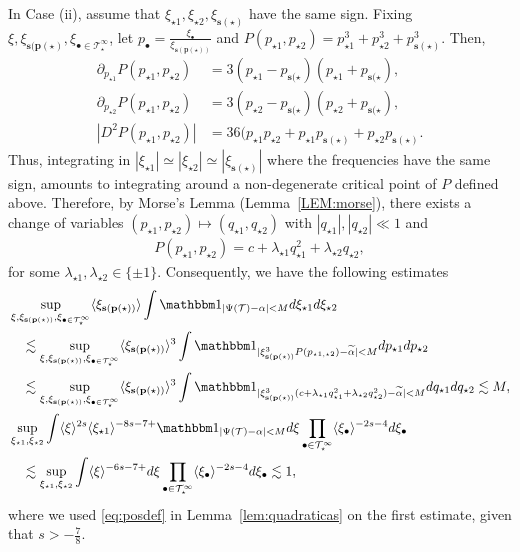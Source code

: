 \documentclass[%
11pt,  reqno]{amsart}
\newcommand{\5}{\textup{V}}
\newcommand{\ind}{\mathbbm 1}
\newcommand{\les}{\lesssim}
\newcommand{\wt}{\widetilde}
\theoremstyle{remark}
\newcommand{\bul}{\bullet}
\newcommand{\TT}{\mathcal{T}}
\newcommand{\al}{\alpha}
\newcommand{\ld}{\lambda}
\newcommand{\pb}{\mathbf{p}}
\newcommand{\sbf}{\mathbf{s}}
\newcommand{\jb}[1]
{\langle #1 \rangle}
\numberwithin{equation}{section}
\numberwithin{theorem}{section}
\begin{document}
In Case (ii), assume that $\xi_{\star1}, \xi_{\star2}, \xi_{\sbf(\star)}$ have the same sign. Fixing $\xi, \xi_{\sbf(\pb(\star)}, \xi_{\bul\in\TT^\infty_\star}$, let $p_\bul = \frac{\xi_\bul}{\xi_{\sbf(\pb(\star))}}$ and $P(p_{\star1}, p_{\star2}) = p^3_{\star1} + p^3_{\star2} + p_{\sbf(\star)}^3$. Then, 
\begin{align}
    \partial_{p_{\star1}} P(p_{\star1}, p_{\star2}) & = 3(p_{\star1} - p_{\sbf(\star}) (p_{\star1} + p_{\sbf(\star}), 
    \\
    \partial_{p_{\star2}} P(p_{\star1}, p_{\star2}) & = 3(p_{\star2} - p_{\sbf(\star}) (p_{\star2} + p_{\sbf(\star}),
    \\
    | D^2 P(p_{\star1}, p_{\star2}) | 
    &
    = 36 (p_{\star1} p_{\star2} + p_{\star1} p_{\sbf(\star)} + p_{\star2} p_{\sbf(\star)}.
\end{align}
Thus, integrating in $|\xi_{\star1}| \simeq |\xi_{\star2}|\simeq |\xi_{\sbf(\star)}|$ where the frequencies have the same sign, amounts to integrating around a non-degenerate critical point of $P$ defined above. Therefore, by Morse's Lemma (Lemma~\ref{LEM:morse}), there exists a change of variables $(p_{\star1}, p_{\star2}) \mapsto (q_{\star1}, q_{\star2})$ with $|q_{\star1}|, |q_{\star2}| \ll 1$ and 
\begin{align}
    P(p_{\star1}, p_{\star2}) = c + \ld_{\star1} q_{\star1}^2 + \ld_{\star2} q_{\star2}, 
\end{align}
for some $\ld_{\star1}, \ld_{\star2} \in \{\pm1 \}$. Consequently, we have the following estimates
\begin{align}
    & 
    \sup_{\xi, \xi_{\sbf(\pb(\star))}, \xi_{\bul\in\TT^\infty_\star}}
     \jb{\xi_{\sbf(\pb(\star))}} 
     \int
    \ind_{|\Psi(\TT) - \al| < M } d \xi_{\star1} d\xi_{\star2} 
    \\
    &
    \quad 
    \les 
    \sup_{\xi, \xi_{\sbf(\pb(\star))}, \xi_{\bul\in\TT^\infty_\star}}
     \jb{\xi_{\sbf(\pb(\star))}}^3
     \int
    \ind_{|\xi_{\sbf(\pb(\star))}^3 P(p_{\star1, \star2}) - \wt\al| < M } d p_{\star1} dp_{\star2} 
    \\
    &
    \quad 
    \les 
    \sup_{\xi, \xi_{\sbf(\pb(\star))}, \xi_{\bul\in\TT^\infty_\star}}
     \jb{\xi_{\sbf(\pb(\star))}}^3
     \int
    \ind_{|\xi_{\sbf(\pb(\star))}^3 ( c + \ld_{\star1} q_{\star1}^2 + \ld_{\star2} q_{\star2}^2) - \wt\al| < M } d q_{\star1} dq_{\star2} \les M , 
    \\
    &
    \sup_{\xi_{\star1}, \xi_{\star2}}
    \int 
    \jb{\xi}^{2s} \jb{\xi_{\star1}}^{-8s - 7 +} \ind_{|\Psi(\TT) - \al| < M } d \xi \prod_{\bul\in \TT^\infty_\star} \jb{\xi_\bul}^{-2s-4} d\xi_\bul 
    \\
    &
    \quad 
    \les 
    \sup_{\xi_{\star1}, \xi_{\star2}}
    \int 
    \jb{\xi}^{-6s - 7 + }  d \xi \prod_{\bul\in \TT^\infty_\star} \jb{\xi_\bul}^{-2s-4} d\xi_\bul \les 1, 
\end{align}
where we used \eqref{eq:posdef} in Lemma~\ref{lem:quadraticas} on the first estimate, given that $s>-\frac78$. 
\end{document}
